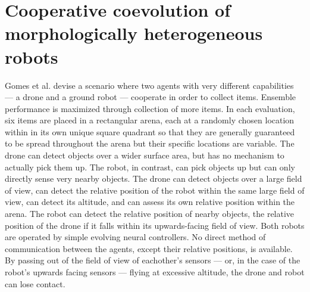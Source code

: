 \section{Cooperative coevolution of morphologically heterogeneous robots \cite{gomes2015cooperative}}

Gomes et al. devise a scenario where two agents with very different capabilities --- a drone and a ground robot --- cooperate in order to collect items.
Ensemble performance is maximized through collection of more items.
In each evaluation, six items are placed in a rectangular arena, each at a randomly chosen location within in its own unique square quadrant so that they are generally guaranteed to be spread throughout the arena but their specific locations are variable.
The drone can detect objects over a wider surface area, but has no mechanism to actually pick them up.
The robot, in contrast, can pick objects up but can only directly sense very nearby objects.
The drone can detect objects over a large field of view, can detect the relative position of the robot within the same large field of view, can detect its altitude, and can assess its own relative position within the arena.
The robot can detect the relative position of nearby objects, the relative position of the drone if it falls within its upwards-facing field of view.
Both robots are operated by simple evolving neural controllers.
No direct method of communication between the agents, except their relative positions, is available.
By passing out of the field of view of eachother's sensors --- or, in the case of the robot's upwards facing sensors --- flying at excessive altitude, the drone and robot can lose contact.
